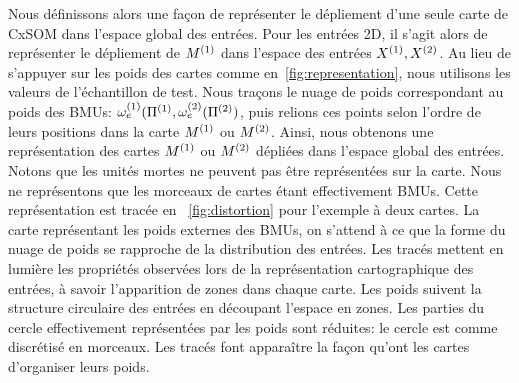 Nous définissons alors une façon de représenter le dépliement d'une seule carte de CxSOM dans l'espace global des entrées. Pour les entrées 2D, il s'agit alors de représenter le dépliement de $M^{({1})}$ dans l'espace des entrées $X^{({1})},X^{({2})}$.
Au lieu de s'appuyer sur les poids des cartes comme en~\ref{fig:representation}, nous utilisons les valeurs de l'échantillon de test. Nous traçons le nuage de poids correspondant au poids des BMUs: $\omega_e^{({1})}(\Pi^{({1})},\omega_e^{({2})}(\Pi^{({2})})$, puis relions ces points selon l'ordre de leurs positions dans la carte $M^{({1})}$ ou $M^{({2})}$. Ainsi, nous obtenons une représentation des cartes $M^{({1})}$ ou $M^{({2})}$ dépliées dans l'espace global des entrées. 
Notons que les unités mortes ne peuvent pas être représentées sur la carte. Nous ne représentons que les morceaux de cartes étant effectivement BMUs. 
Cette représentation est tracée en ~\ref{fig:distortion} pour l'exemple à deux cartes.
La carte représentant les poids externes des BMUs, on s'attend à ce que la forme du nuage de poids se rapproche de la distribution des entrées.
Les tracés mettent en lumière les propriétés observées lors de la représentation cartographique des entrées, à savoir l'apparition de zones dans chaque carte. Les poids suivent la structure circulaire des entrées en découpant l'espace en zones. Les parties du cercle effectivement représentées par les poids sont réduites: le cercle est comme discrétisé en morceaux. 
Les tracés font apparaître la façon qu'ont les cartes d'organiser leurs poids. 

